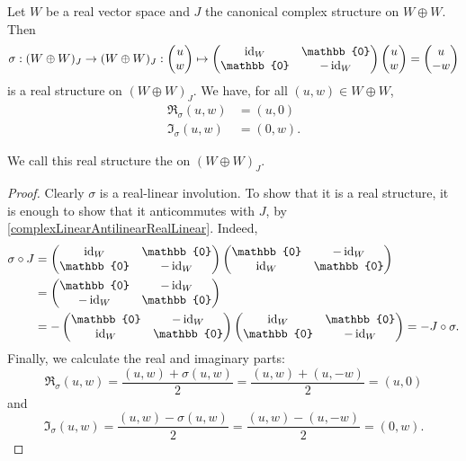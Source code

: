 \begin{lemma}
Let $W$ be a real vector space and $J$ the canonical complex structure on $W\oplus W$. Then
\[ \sigma: (W\oplus W)_J \to (W\oplus W)_J: \begin{pmatrix}
u \\ w
\end{pmatrix} \mapsto \begin{pmatrix}
\id_W & \mathbb{0} \\
\mathbb{0} & -\id_W
\end{pmatrix}\begin{pmatrix}
u \\ w
\end{pmatrix} = \begin{pmatrix}
u \\ -w
\end{pmatrix} \]
is a real structure on $(W\oplus W)_J$. We have, for all $(u,w)\in W\oplus W$,
\begin{align*}
\Re_\sigma(u,w) &= (u,0) \\
\Im_\sigma(u,w) &= (0,w).
\end{align*}
\end{lemma}
We call this real structure the  on $(W\oplus W)_J$.
\begin{proof}
Clearly $\sigma$ is a real-linear involution. To show that it is a real structure, it is enough to show that it anticommutes with $J$, by \ref{complexLinearAntilinearRealLinear}. Indeed,
\begin{align*}
\sigma\circ J &= \begin{pmatrix}
\id_W & \mathbb{0} \\
\mathbb{0} & -\id_W
\end{pmatrix}\begin{pmatrix}
\mathbb{0} & -\id_W \\
\id_W & \mathbb{0}
\end{pmatrix} \\
&= \begin{pmatrix}
\mathbb{0} & -\id_W \\
-\id_W & \mathbb{0}
\end{pmatrix} \\
&= -\begin{pmatrix}
\mathbb{0} & -\id_W \\
\id_W & \mathbb{0}
\end{pmatrix}\begin{pmatrix}
\id_W & \mathbb{0} \\
\mathbb{0} & -\id_W
\end{pmatrix} = -J\circ \sigma.
\end{align*}
Finally, we calculate the real and imaginary parts:
\[ \Re_\sigma(u,w) = \frac{(u,w)+\sigma(u,w)}{2} = \frac{(u,w)+(u,-w)}{2} = (u,0) \]
and
\[ \Im_\sigma(u,w) = \frac{(u,w)-\sigma(u,w)}{2} = \frac{(u,w)-(u,-w)}{2} = (0,w). \]
\end{proof}




